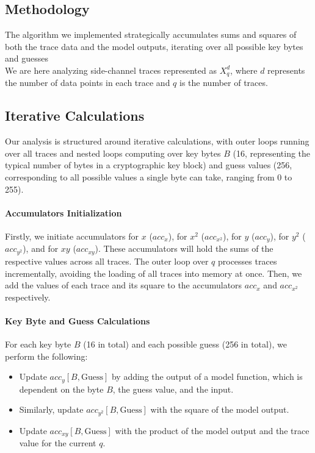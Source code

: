 \documentclass[a4paper,10pt]{article}
\begin{document}
\subsection{Methodology}
The algorithm we implemented strategically accumulates sums and squares of both the trace data and the model outputs, iterating over all possible key bytes and guesses
\\
\newline
We are here analyzing side-channel traces represented as $X^{d}_{q}$, 
where \(d\) represents the number of data points in each trace and \(q\) is the number of traces. 

\subsection{Iterative Calculations}
Our analysis is structured around iterative calculations, with outer loops running over all traces and nested loops computing over key bytes \(B\)
 (16, representing the typical number of bytes in a cryptographic key block) and guess values (256, corresponding to all possible values a single byte can take, ranging from 0 to 255).

\paragraph{Accumulators Initialization}
Firstly, we initiate accumulators for $x$ ($acc_{x}$), for $x^2$ ($acc_{x^2}$), for $y$ ($acc_{y}$), for $y^2$ ($acc_{y^2}$), and for $xy$ ($acc_{xy}$).
These accumulators will hold the sums of the respective values across all traces.
The outer loop over $q$ processes traces incrementally, avoiding the loading of all traces into memory at once. Then, we add the values of each trace and its square to the accumulators $acc_x$ and $acc_{x^2}$ respectively.

\paragraph{Key Byte and Guess Calculations}
For each key byte $B$ (16 in total) and each possible guess (256 in total), we perform the following:
\begin{itemize}
    \item Update $acc_y[B, \text{Guess}]$ by adding the output of a model function, which is dependent on the byte $B$, the guess value, and the input.

    \item Similarly, update $acc_{y^2}[B, \text{Guess}]$ with the square of the model output.

    \item Update $acc_{xy}[B, \text{Guess}]$ with the product of the model output and the trace value for the current $q$.

\end{itemize}
\end{document}
